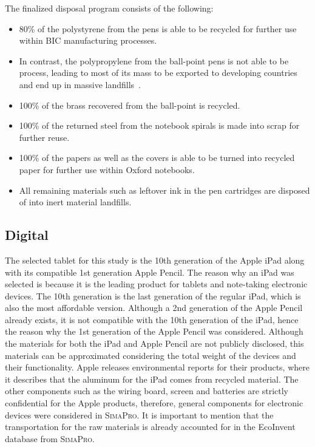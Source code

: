 The finalized disposal program consists of the following:
\begin{itemize}
    \item 80\% of the polystyrene from the pens is able to be recycled for further use within BIC manufacturing processes.
    \item In contrast, the polypropylene from the ball-point pens is not able to be process, leading to most of its mass to be exported to developing countries and end up in massive landfills~\cite{BICballpoint}.
    \item 100\% of the brass recovered from the ball-point is recycled.
    \item 100\% of the returned steel from the notebook spirals is made into scrap for further reuse.
    \item 100\% of the papers as well as the covers is able to be turned into recycled paper for further use within Oxford notebooks.
    \item All remaining materials such as leftover ink in the pen cartridges are disposed of into inert material landfills.
\end{itemize}

\subsection{Digital}\label{subsec:digital_scenario}
The selected tablet for this study is the 10th generation of the Apple iPad along with its compatible 1st generation Apple Pencil. The reason why an iPad was selected is because it is the leading product for tablets and note-taking electronic devices. The 10th generation is the last generation of the regular iPad, which is also the most affordable version. Although a 2nd generation of the Apple Pencil already exists, it is not compatible with the 10th generation of the iPad, hence the reason why the 1st generation of the Apple Pencil was considered. Although the materials for both the iPad and Apple Pencil are not publicly disclosed, this materials can be approximated considering the total weight of the devices and their functionality. Apple releases environmental reports for their products, where it describes that the aluminum for the iPad comes from recycled material. The other components such as the wiring board, screen and batteries are strictly confidential for the Apple products, therefore, general components for electronic devices were considered in \textsc{SimaPro}. It is important to mention that the transportation for the raw materials is already accounted for in the EcoInvent database from \textsc{SimaPro}.

